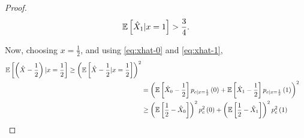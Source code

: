 \documentclass[twoside]{article}
\begin{document}
\begin{proof}
    \begin{equation}
        \mathbb{E}\left[ \hat{X}_1|x=1 \right] > \frac{3}{4}.
        \label{eq:xhat-1}
    \end{equation}

    Now, choosing \(x=\frac{1}{2}\), and using \eqref{eq:xhat-0} and \eqref{eq:xhat-1},
    \begin{align}
        \mathbb{E}\left[ \left(\hat{X}-\frac{1}{2}\right)|x=\frac{1}{2} \right] \ge \left(\mathbb{E}\left[ \hat{X}-\frac{1}{2}|x=\frac{1}{2} \right]\right)^2 \\
        &= \left(\mathbb{E}\left[ \hat{X}_0-\frac{1}{2} \right]p_{c|x=\frac{1}{2}}\left(0\right)+\mathbb{E}\left[ \hat{X}_1-\frac{1}{2} \right]p_{c|x=\frac{1}{2}}\left(1\right)\right)^2 \\
        &\ge \left(\mathbb{E}\left[ \frac{1}{2}-\hat{X}_0 \right]\right)^2p_{c}^2\left(0\right) + \left(\mathbb{E}\left[ \frac{1}{2}-\hat{X}_1 \right]\right)^2p_{c}^2\left(1\right)
    \end{align}
\end{proof}
\end{document}
